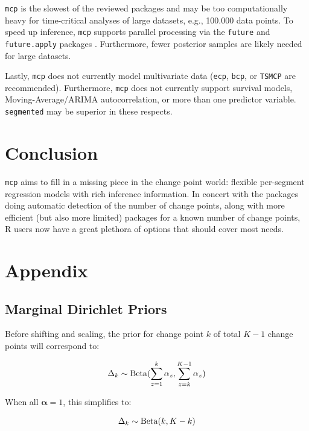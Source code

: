 \documentclass[
  american,
]{article}
\begin{document}
\texttt{mcp} is the slowest of the reviewed packages and may be too computationally heavy for time-critical analyses of large datasets, e.g., 100.000 data points. To speed up inference, \texttt{mcp} supports parallel processing via the \texttt{future} and \texttt{future.apply} packages \citep{bengtsson2019}. Furthermore, fewer posterior samples are likely needed for large datasets.

Lastly, \texttt{mcp} does not currently model multivariate data (\texttt{ecp}, \texttt{bcp}, or \texttt{TSMCP} are recommended). Furthermore, \texttt{mcp} does not currently support survival models, Moving-Average/ARIMA autocorrelation, or more than one predictor variable. \texttt{segmented} may be superior in these respects.

\hypertarget{conclusion}{%
\section{Conclusion}\label{conclusion}}

\texttt{mcp} aims to fill in a missing piece in the change point world: flexible per-segment regression models with rich inference information. In concert with the packages doing automatic detection of the number of change points, along with more efficient (but also more limited) packages for a known number of change points, R users now have a great plethora of options that should cover most needs.

\hypertarget{appendix}{%
\section{Appendix}\label{appendix}}

\hypertarget{marginal-dirichlet-priors}{%
\subsection{Marginal Dirichlet Priors}\label{marginal-dirichlet-priors}}

Before shifting and scaling, the prior for change point \(k\) of total \(K-1\) change points will correspond to:

\begin{equation}
\Delta_k \sim {\rm Beta}(\sum_{z = 1}^k \alpha_z, \sum_{z=k}^{K-1} \alpha_z)
\end{equation}

When all \(\mathbf{\alpha} = 1\), this simplifies to:

\begin{equation}
\Delta_k \sim {\rm Beta}(k, K - k)
\end{equation}
\end{document}
